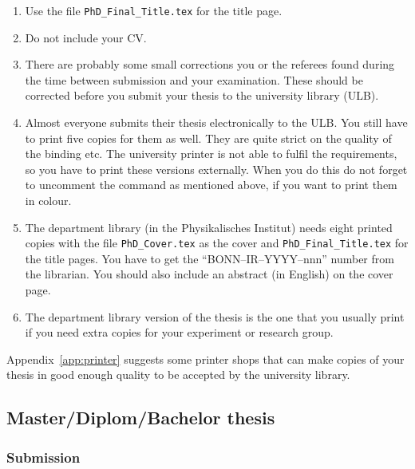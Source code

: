 \begin{enumerate}
\item Use the file \texttt{PhD\_Final\_Title.tex} for the title page.
\item Do not include your CV.
\item There are probably some small corrections you or the referees
  found during the time between submission and your examination. These
  should be corrected before you submit your thesis to the university
  library (ULB).
\item Almost everyone submits their thesis electronically to the
  ULB. You still have to print five copies for them as well. They are
  quite strict on the quality of the binding etc. The university
  printer is not able to fulfil the requirements, so you have to print
  these versions externally. When you do this do not forget to
  uncomment the  command as mentioned above, if you
  want to print them in colour.
\item The department
  library (in the Physikalisches
  Institut) needs eight printed copies with the file
  \texttt{PhD\_Cover.tex} as the cover and
  \texttt{PhD\_Final\_Title.tex} for the title pages. You have to get
  the \enquote{BONN--IR--YYYY--nnn} number from the librarian. You
  should also include an abstract (in English) on the cover page.
\item The department library version of the thesis is the one that you usually print if
  you need extra copies for your experiment or research group.
\end{enumerate}

Appendix~\ref{app:printer} suggests some printer shops that can make copies
of your thesis in good enough quality to be accepted by the university
library.


\subsection{Master/Diplom/Bachelor thesis}
\label{sec:tips:submit:other}

\subsubsection{Submission}

